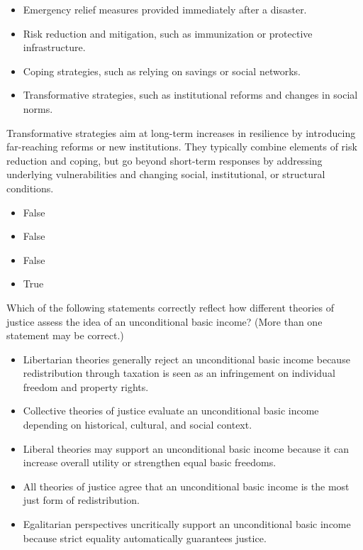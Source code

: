 \documentclass[
  a4paper,
  DIV=11,
  numbers=noendperiod,
  oneside,
  openany]{scrreprt}
\providecommand{\tightlist}{%
  \setlength{\itemsep}{0pt}\setlength{\parskip}{0pt}}
\begin{document}
\begin{itemize}
\tightlist
\item[$\square$]
  Emergency relief measures provided immediately after a disaster.
\item[$\square$]
  Risk reduction and mitigation, such as immunization or protective
  infrastructure.
\item[$\square$]
  Coping strategies, such as relying on savings or social networks.
\item[$\square$]
  Transformative strategies, such as institutional reforms and changes
  in social norms.
\end{itemize}

Transformative strategies aim at long-term increases in resilience by
introducing far-reaching reforms or new institutions. They typically
combine elements of risk reduction and coping, but go beyond short-term
responses by addressing underlying vulnerabilities and changing social,
institutional, or structural conditions.

\begin{itemize}
\tightlist
\item
  False
\item
  False
\item
  False
\item
  True
\end{itemize}

Which of the following statements correctly reflect how different
theories of justice assess the idea of an unconditional basic income?
(More than one statement may be correct.)

\begin{itemize}
\tightlist
\item[$\square$]
  Libertarian theories generally reject an unconditional basic income
  because redistribution through taxation is seen as an infringement on
  individual freedom and property rights.
\item[$\square$]
  Collective theories of justice evaluate an unconditional basic income
  depending on historical, cultural, and social context.
\item[$\square$]
  Liberal theories may support an unconditional basic income because it
  can increase overall utility or strengthen equal basic freedoms.
\item[$\square$]
  All theories of justice agree that an unconditional basic income is
  the most just form of redistribution.
\item[$\square$]
  Egalitarian perspectives uncritically support an unconditional basic
  income because strict equality automatically guarantees justice.
\end{itemize}
\end{document}
